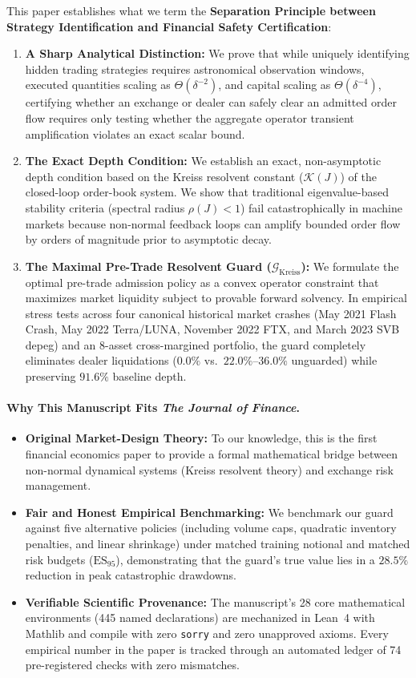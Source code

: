 \documentclass[11pt]{article}
\begin{document}
This paper establishes what we term the \textbf{Separation Principle between Strategy Identification and Financial Safety Certification}:
\begin{enumerate}
    \item \textbf{A Sharp Analytical Distinction:} We prove that while uniquely identifying hidden trading strategies requires astronomical observation windows, executed quantities scaling as $\Theta(\delta^{-2})$, and capital scaling as $\Theta(\delta^{-4})$, certifying whether an exchange or dealer can safely clear an admitted order flow requires only testing whether the aggregate operator transient amplification violates an exact scalar bound.
    \item \textbf{The Exact Depth Condition:} We establish an exact, non-asymptotic depth condition based on the Kreiss resolvent constant ($\mathcal{K}(J)$) of the closed-loop order-book system. We show that traditional eigenvalue-based stability criteria (spectral radius $\rho(J) < 1$) fail catastrophically in machine markets because non-normal feedback loops can amplify bounded order flow by orders of magnitude prior to asymptotic decay.
    \item \textbf{The Maximal Pre-Trade Resolvent Guard ($\mathcal{G}_{\mathrm{Kreiss}}$):} We formulate the optimal pre-trade admission policy as a convex operator constraint that maximizes market liquidity subject to provable forward solvency. In empirical stress tests across four canonical historical market crashes (May 2021 Flash Crash, May 2022 Terra/LUNA, November 2022 FTX, and March 2023 SVB depeg) and an 8-asset cross-margined portfolio, the guard completely eliminates dealer liquidations ($0.0\%$ vs.\ $22.0\%$--$36.0\%$ unguarded) while preserving $91.6\%$ baseline depth.
\end{enumerate}

\paragraph{Why This Manuscript Fits \textit{The Journal of Finance}.}
\begin{itemize}
    \item \textbf{Original Market-Design Theory:} To our knowledge, this is the first financial economics paper to provide a formal mathematical bridge between non-normal dynamical systems (Kreiss resolvent theory) and exchange risk management.
    \item \textbf{Fair and Honest Empirical Benchmarking:} We benchmark our guard against five alternative policies (including volume caps, quadratic inventory penalties, and linear shrinkage) under matched training notional and matched risk budgets ($\mathrm{ES}_{95}$), demonstrating that the guard's true value lies in a $28.5\%$ reduction in peak catastrophic drawdowns.
    \item \textbf{Verifiable Scientific Provenance:} The manuscript's 28 core mathematical environments (445 named declarations) are mechanized in Lean~4 with Mathlib and compile with zero \texttt{sorry} and zero unapproved axioms. Every empirical number in the paper is tracked through an automated ledger of 74 pre-registered checks with zero mismatches.
\end{itemize}
\end{document}
